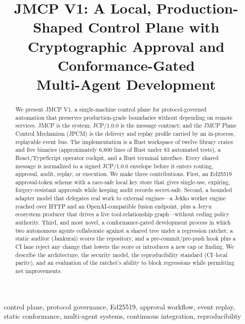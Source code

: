 \documentclass[conference]{IEEEtran}
\begin{document}
\title{JMCP V1: A Local, Production-Shaped Control Plane with\\
Cryptographic Approval and Conformance-Gated\\
Multi-Agent Development}

\author{
}

\maketitle

\begin{abstract}
We present JMCP V1, a single-machine control plane for protocol-governed
automation that preserves production-grade boundaries without depending on
remote services. JMCP is the system; JCP/1.0.0 is the message contract; and
the JMCP Plane Control Mechanism (JPCM) is the delivery and replay profile
carried by an in-process, replayable event bus. The implementation is a Rust
workspace of twelve library crates and five binaries (approximately 6{,}800
lines of Rust under 83 automated tests), a React/TypeScript operator cockpit,
and a Rust terminal interface. Every shared message is normalized to a signed
JCP/1.0.0 envelope before it enters routing, approval, audit, replay, or
execution. We make three contributions. First, an Ed25519 approval-token
scheme with a race-safe local key store that gives single-use, expiring,
forgery-resistant approvals while keeping audit records secret-safe. Second, a
bounded adapter model that delegates real work to external engines---a Jekko
worker engine reached over HTTP and an OpenAI-compatible fusion endpoint, plus
a Jeryu ecosystem producer that drives a live tool-relationship graph---without
ceding policy authority. Third, and most novel, a conformance-gated
development process in which two autonomous agents collaborate against a shared
tree under a regression ratchet: a static auditor (Jankurai) scores the
repository, and a pre-commit/pre-push hook plus a CI lane reject any change
that lowers the score or introduces a new cap or finding. We describe the
architecture, the security model, the reproducibility standard (CI--local
parity), and an evaluation of the ratchet's ability to block regressions while
permitting net improvements.
\end{abstract}

\begin{IEEEkeywords}
control plane, protocol governance, Ed25519, approval workflow, event replay,
static conformance, multi-agent systems, continuous integration,
reproducibility
\end{IEEEkeywords}
\end{document}
